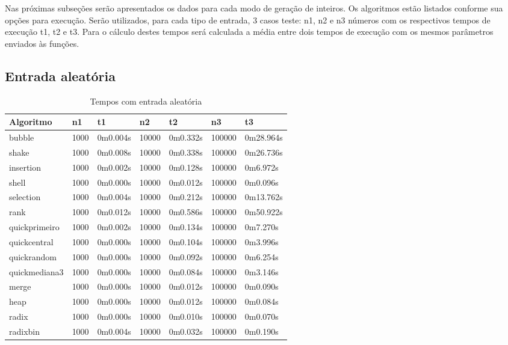\documentclass[
	article,			%
	11pt,				%
	oneside,			%
	a4paper,			%
	english,			%
	brazil,				%
	sumario=tradicional
	]{abntex2}
\begin{document}
Nas próximas subseções serão apresentados os dados para cada modo de geração de inteiros. Os algoritmos estão listados conforme sua opções para execução. Serão utilizados, para cada tipo de entrada, 3 casos teste: n1, n2 e n3 números com os respectivos tempos de execução t1, t2 e t3. Para o cálculo destes tempos será calculada a média entre dois tempos de execução com os mesmos parâmetros enviados às funções.

\subsection{Entrada aleatória}

\begin{table}[!h]
\centering
\caption{Tempos com entrada aleatória}
\label{my-label}
\begin{tabular}{|l|l|l|l|l|l|l|}
\hline
Algoritmo     & n1 & t1 & n2 & t2 & n3 & t3 \\ \hline
bubble        & 1000   & 0m0.004s   & 10000   & 0m0.332s   & 100000   & 0m28.964s   \\ \hline
shake         & 1000   & 0m0.008s   & 10000   & 0m0.338s   & 100000   & 0m26.736s   \\ \hline
insertion     & 1000   & 0m0.002s   & 10000   & 0m0.128s   & 100000   & 0m6.972s   \\ \hline
shell         & 1000   & 0m0.000s   & 10000   & 0m0.012s   & 100000   & 0m0.096s   \\ \hline
selection     & 1000   & 0m0.004s   & 10000   & 0m0.212s   & 100000   & 0m13.762s   \\ \hline
rank          & 1000   & 0m0.012s   & 10000   & 0m0.586s   & 100000   & 0m50.922s   \\ \hline
quickprimeiro & 1000   & 0m0.002s   & 10000   & 0m0.134s   & 100000   & 0m7.270s   \\ \hline
quickcentral  & 1000   & 0m0.000s   & 10000   & 0m0.104s   & 100000   & 0m3.996s   \\ \hline
quickrandom   & 1000   & 0m0.000s   & 10000   & 0m0.092s   & 100000   & 0m6.254s   \\ \hline
quickmediana3 & 1000   & 0m0.000s   & 10000   & 0m0.084s   & 100000   & 0m3.146s  \\ \hline
merge         & 1000   & 0m0.000s   & 10000   & 0m0.012s   & 100000   & 0m0.090s   \\ \hline
heap          & 1000   & 0m0.000s   & 10000   & 0m0.012s   & 100000   & 0m0.084s   \\ \hline
radix         & 1000   & 0m0.000s   & 10000   & 0m0.010s   & 100000   & 0m0.070s   \\ \hline
radixbin      & 1000   & 0m0.004s   & 10000   & 0m0.032s   & 100000   & 0m0.190s   \\ \hline
\end{tabular}
\end{table}
\end{document}
